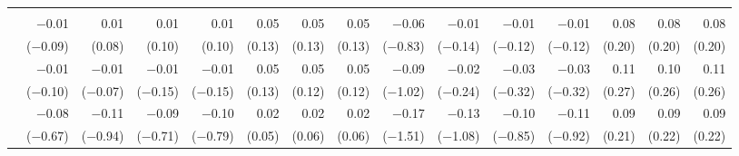 \begin{tabularx}{1.45\textwidth}{lRRRRRRRRRRRRRR}
		\midrule
		 \\[\panelspacing]
		 & \num{-0.01}\phantom{***)} & \num{0.01}\phantom{***)} & \num{0.01}\phantom{***)} & \num{0.01}\phantom{***)} & \num{0.05}\phantom{***)} & \num{0.05}\phantom{***)} & \num{0.05}\phantom{***)} & \num{-0.06}\phantom{***)} & \num{-0.01}\phantom{***)} & \num{-0.01}\phantom{***)} & \num{-0.01}\phantom{***)} & \num{0.08}\phantom{***)} & \num{0.08}\phantom{***)} & \num{0.08}\phantom{***)} \\
		 & (\num{-0.09})\phantom{***} & (\num{0.08})\phantom{***} & (\num{0.10})\phantom{***} & (\num{0.10})\phantom{***} & (\num{0.13})\phantom{***} & (\num{0.13})\phantom{***} & (\num{0.13})\phantom{***} & (\num{-0.83})\phantom{***} & (\num{-0.14})\phantom{***} & (\num{-0.12})\phantom{***} & (\num{-0.12})\phantom{***} & (\num{0.20})\phantom{***} & (\num{0.20})\phantom{***} & (\num{0.20})\phantom{***} \\ [\dspacing]
		 & \num{-0.01}\phantom{***)} & \num{-0.01}\phantom{***)} & \num{-0.01}\phantom{***)} & \num{-0.01}\phantom{***)} & \num{0.05}\phantom{***)} & \num{0.05}\phantom{***)} & \num{0.05}\phantom{***)} & \num{-0.09}\phantom{***)} & \num{-0.02}\phantom{***)} & \num{-0.03}\phantom{***)} & \num{-0.03}\phantom{***)} & \num{0.11}\phantom{***)} & \num{0.10}\phantom{***)} & \num{0.11}\phantom{***)} \\
		 & (\num{-0.10})\phantom{***} & (\num{-0.07})\phantom{***} & (\num{-0.15})\phantom{***} & (\num{-0.15})\phantom{***} & (\num{0.13})\phantom{***} & (\num{0.12})\phantom{***} & (\num{0.12})\phantom{***} & (\num{-1.02})\phantom{***} & (\num{-0.24})\phantom{***} & (\num{-0.32})\phantom{***} & (\num{-0.32})\phantom{***} & (\num{0.27})\phantom{***} & (\num{0.26})\phantom{***} & (\num{0.26})\phantom{***} \\ [\dspacing]
		 & \num{-0.08}\phantom{***)} & \num{-0.11}\phantom{***)} & \num{-0.09}\phantom{***)} & \num{-0.10}\phantom{***)} & \num{0.02}\phantom{***)} & \num{0.02}\phantom{***)} & \num{0.02}\phantom{***)} & \num{-0.17}\phantom{***)} & \num{-0.13}\phantom{***)} & \num{-0.10}\phantom{***)} & \num{-0.11}\phantom{***)} & \num{0.09}\phantom{***)} & \num{0.09}\phantom{***)} & \num{0.09}\phantom{***)} \\
		 & (\num{-0.67})\phantom{***} & (\num{-0.94})\phantom{***} & (\num{-0.71})\phantom{***} & (\num{-0.79})\phantom{***} & (\num{0.05})\phantom{***} & (\num{0.06})\phantom{***} & (\num{0.06})\phantom{***} & (\num{-1.51})\phantom{***} & (\num{-1.08})\phantom{***} & (\num{-0.85})\phantom{***} & (\num{-0.92})\phantom{***} & (\num{0.21})\phantom{***} & (\num{0.22})\phantom{***} & (\num{0.22})\phantom{***} \\ [\dspacing]

\end{tabularx}
